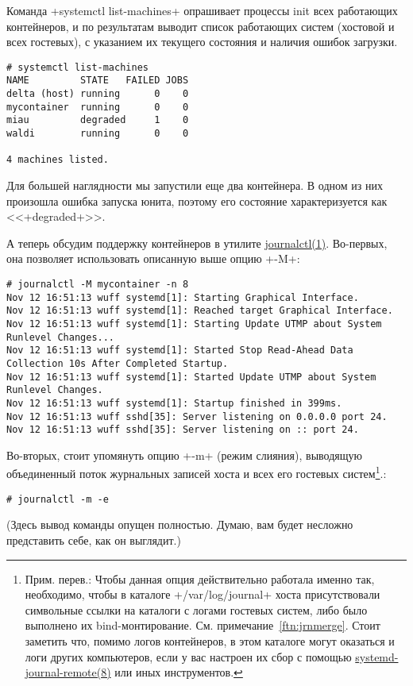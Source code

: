 \documentclass[10pt,oneside,a4paper]{article}
\begin{document}
Команда +systemctl list-machines+ опрашивает процессы init всех работающих
контейнеров, и по результатам выводит список работающих систем 
(хостовой и всех гостевых), с указанием их текущего состояния и наличия 
ошибок загрузки.
\begin{Verbatim}
# systemctl list-machines
NAME         STATE   FAILED JOBS
delta (host) running      0    0
mycontainer  running      0    0
miau         degraded     1    0
waldi        running      0    0

4 machines listed.
\end{Verbatim}

Для большей наглядности мы запустили еще два контейнера. В одном из них
произошла ошибка запуска юнита, поэтому его состояние характеризуется как
<<+degraded+>>.

А теперь обсудим поддержку контейнеров в утилите
\href{http://www.freedesktop.org/software/systemd/man/journalctl.html}{journalctl(1)}.
Во-первых, она позволяет использовать описанную выше опцию +-M+:
\begin{Verbatim}[fontsize=\small]
# journalctl -M mycontainer -n 8
Nov 12 16:51:13 wuff systemd[1]: Starting Graphical Interface.
Nov 12 16:51:13 wuff systemd[1]: Reached target Graphical Interface.
Nov 12 16:51:13 wuff systemd[1]: Starting Update UTMP about System Runlevel Changes...
Nov 12 16:51:13 wuff systemd[1]: Started Stop Read-Ahead Data Collection 10s After Completed Startup.
Nov 12 16:51:13 wuff systemd[1]: Started Update UTMP about System Runlevel Changes.
Nov 12 16:51:13 wuff systemd[1]: Startup finished in 399ms.
Nov 12 16:51:13 wuff sshd[35]: Server listening on 0.0.0.0 port 24.
Nov 12 16:51:13 wuff sshd[35]: Server listening on :: port 24.
\end{Verbatim}

Во-вторых, стоит упомянуть опцию +-m+ (режим слияния), выводящую объединенный
поток журнальных записей хоста и всех его гостевых систем\footnote{Прим. перев.:
Чтобы данная опция действительно работала именно так, необходимо, чтобы в
каталоге +/var/log/journal+ хоста присутствовали символьные ссылки на каталоги с
логами гостевых систем, либо было выполнено их bind-монтирование. См.
примечание~\ref{ftn:jrnmerge}. Стоит заметить что, помимо логов контейнеров, в
этом каталоге могут оказаться и логи других компьютеров, если у вас настроен их
сбор с помощью
\href{http://www.freedesktop.org/software/systemd/man/systemd-journal-remote.html}{systemd-journal-remote(8)}
или иных инструментов.}.: 
\begin{Verbatim}
# journalctl -m -e
\end{Verbatim}
(Здесь вывод команды опущен полностью. Думаю, вам будет несложно представить
себе, как он выглядит.)
\end{document}
